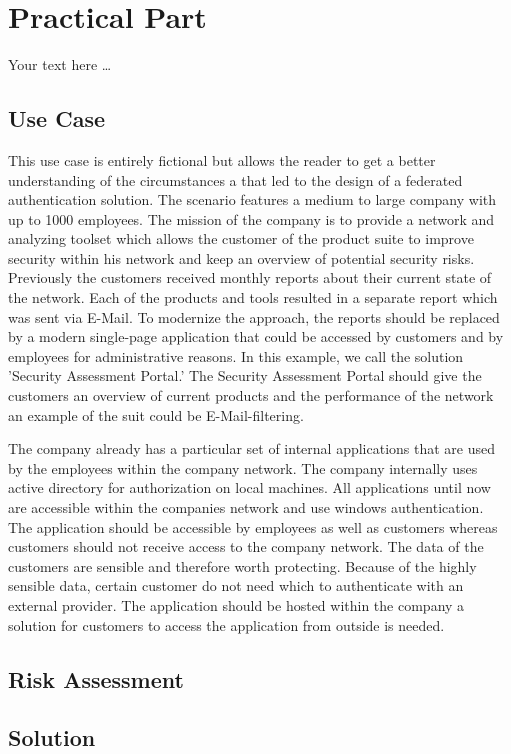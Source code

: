 \chapter{Practical Part}\label{chap:practicalPart}
\chapterstart

Your text here \ldots
\section{Use Case}
This use case is entirely fictional but allows the reader to get a better understanding of the circumstances a that led to the design of a federated authentication solution. The scenario features a medium to large company with up to 1000 employees. The mission of the company is to provide a network and analyzing toolset which allows the customer of the product suite to improve security within his network and keep an overview of potential security risks. Previously the customers received monthly reports about their current state of the network. Each of the products and tools resulted in a separate report which was sent via E-Mail. To modernize the approach, the reports should be replaced by a modern single-page application that could be accessed by customers and by employees for administrative reasons. In this example, we call the solution 'Security Assessment Portal.' The Security Assessment Portal should give the customers an overview of current products and the performance of the network an example of the suit could be E-Mail-filtering.  

The company already has a particular set of internal applications that are used by the employees within the company network. The company internally uses active directory for authorization on local machines. All applications until now are accessible within the companies network and use windows authentication. The application should be accessible by employees as well as customers whereas customers should not receive access to the company network. The data of the customers are sensible and therefore worth protecting. Because of the highly sensible data, certain customer do not need which to authenticate with an external provider. The application should be hosted within the company a solution for customers to access the application from outside is needed.


\section{Risk Assessment}



\section{Solution}


\chapterend
